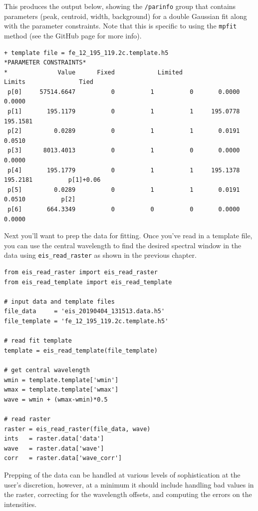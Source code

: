 This produces the output below, showing the \verb+/parinfo+ group that contains  parameters (peak, centroid, width, background) for a double Gaussian fit along with the parameter constraints. Note that this is specific to using the \verb+mpfit+ method (see the GitHub page for more info).
\begin{lstlisting}
+ template file = fe_12_195_119.2c.template.h5
*PARAMETER CONSTRAINTS*
*              Value      Fixed            Limited                 Limits               Tied
 p[0]     57514.6647          0          1          0       0.0000       0.0000
 p[1]       195.1179          0          1          1     195.0778     195.1581
 p[2]         0.0289          0          1          1       0.0191       0.0510
 p[3]      8013.4013          0          1          0       0.0000       0.0000
 p[4]       195.1779          0          1          1     195.1378     195.2181          p[1]+0.06
 p[5]         0.0289          0          1          1       0.0191       0.0510          p[2]
 p[6]       664.3349          0          0          0       0.0000       0.0000
 \end{lstlisting}

 Next you'll want to prep the data for fitting. Once you've read in a template file, you can use the central wavelength to find the desired spectral window in the data using \verb+eis_read_raster+ as shown in the previous chapter.

\begin{lstlisting}
from eis_read_raster import eis_read_raster
from eis_read_template import eis_read_template

# input data and template files
file_data     = 'eis_20190404_131513.data.h5'
file_template = 'fe_12_195_119.2c.template.h5'

# read fit template
template = eis_read_template(file_template)

# get central wavelength
wmin = template.template['wmin']
wmax = template.template['wmax']
wave = wmin + (wmax-wmin)*0.5

# read raster
raster = eis_read_raster(file_data, wave)
ints   = raster.data['data']
wave   = raster.data['wave']
corr   = raster.data['wave_corr']
\end{lstlisting}

Prepping of the data can be handled at various levels of sophistication at the user's discretion, however, at a minimum it should include handling bad values in the raster, correcting for the wavelength offsets, and computing the errors on the intensities.

